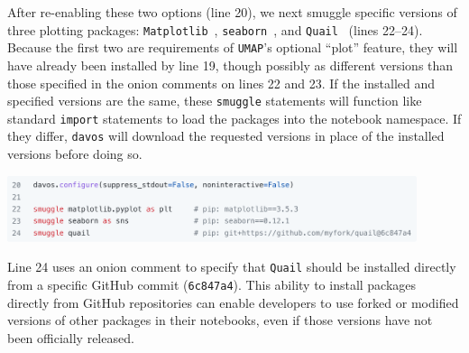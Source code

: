 \documentclass[preprint,12pt,a4paper]{elsarticle}
\begin{document}
After re-enabling these two options (line 20), we next smuggle
specific versions of three plotting packages:
\texttt{Matplotlib}~\cite{Hunt07}, \texttt{seaborn}~\cite{Wask21}, and
\texttt{Quail}~\cite{HeusEtal17} (lines 22--24). Because the first two
are requirements of \texttt{UMAP}'s optional ``plot'' feature, they
will have already been installed by line 19, though possibly as
different versions than those specified in the onion comments on lines
22 and 23. If the installed and specified versions are the same, these
\texttt{smuggle} statements will function like standard \texttt{import}
statements to load the packages into the notebook namespace. If they
differ, \texttt{davos} will download the requested versions in place
of the installed versions before doing so.
\begin{center}
\includegraphics[width=0.9\textwidth]{figs/example5}
\end{center}
Line 24 uses an onion comment to specify that \texttt{Quail} should be
installed directly from a specific GitHub commit (\texttt{6c847a4}).
This ability to install packages directly from GitHub repositories can
enable developers to use forked or modified versions of other
packages in their notebooks, even if those versions have not been
officially released.
\end{document}
